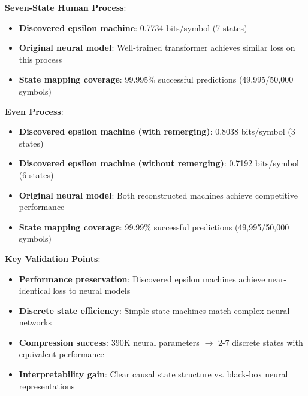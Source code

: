 \documentclass[11pt]{article}
\begin{document}
\begin{resultbox}
\textbf{Seven-State Human Process}:
\begin{itemize}
\item \textbf{Discovered epsilon machine}: 0.7734 bits/symbol (7 states)
\item \textbf{Original neural model}: Well-trained transformer achieves similar loss on this process
\item \textbf{State mapping coverage}: 99.995\% successful predictions (49,995/50,000 symbols)
\end{itemize}

\textbf{Even Process}:
\begin{itemize}
\item \textbf{Discovered epsilon machine (with remerging)}: 0.8038 bits/symbol (3 states)
\item \textbf{Discovered epsilon machine (without remerging)}: 0.7192 bits/symbol (6 states)
\item \textbf{Original neural model}: Both reconstructed machines achieve competitive performance
\item \textbf{State mapping coverage}: 99.99\% successful predictions (49,995/50,000 symbols)
\end{itemize}

\textbf{Key Validation Points}:
\begin{itemize}
\item \textbf{Performance preservation}: Discovered epsilon machines achieve near-identical loss to neural models
\item \textbf{Discrete state efficiency}: Simple state machines match complex neural networks
\item \textbf{Compression success}: 390K neural parameters $\rightarrow$ 2-7 discrete states with equivalent performance
\item \textbf{Interpretability gain}: Clear causal state structure vs. black-box neural representations
\end{itemize}
\end{resultbox}
\end{document}
